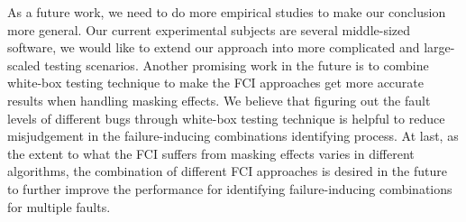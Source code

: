\documentclass{sig-alternate}
\begin{document}
As a future work, we need to do more empirical studies to make our conclusion more general. Our current experimental subjects are several middle-sized software, we would like to extend our approach into more complicated and large-scaled testing scenarios. Another promising work in the future is to combine white-box testing technique to make the FCI approaches get more accurate results when handling masking effects. We believe that figuring out the fault levels of different bugs through white-box testing technique is helpful to reduce misjudgement in the failure-inducing combinations identifying process. At last, as the extent to what the FCI suffers from masking effects varies in different algorithms, the combination of different FCI approaches is desired in the future to further improve the performance for identifying failure-inducing combinations for multiple faults.



%

%
%
%
\end{document}
